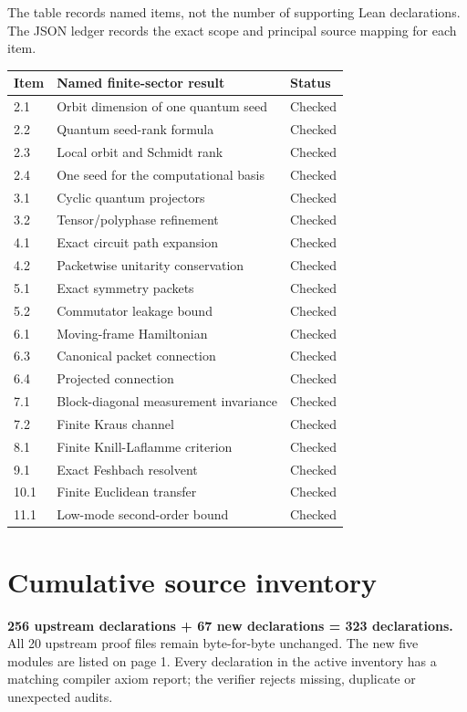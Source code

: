 \documentclass[10pt,letterpaper]{article}
\newcommand{\pageheading}[2]{\vspace*{2pt}{\small\color{ink}\textsc{#1}}\par\vspace{2pt}{\Large\bfseries #2}\par\vspace{4pt}}
\begin{document}
\newpage
\pageheading{Cumulative manuscript coverage}{All 19 finite-sector items}
The table records named items, not the number of supporting Lean declarations. The JSON ledger records the exact scope and principal source mapping for each item.
\begin{center}
\small\renewcommand{\arraystretch}{1.15}
\begin{tabularx}{\linewidth}{@{}lXl@{}}\toprule
Item & Named finite-sector result & Status\\\midrule
2.1 & Orbit dimension of one quantum seed & Checked\\
2.2 & Quantum seed-rank formula & Checked\\
2.3 & Local orbit and Schmidt rank & Checked\\
2.4 & One seed for the computational basis & Checked\\
3.1 & Cyclic quantum projectors & Checked\\
3.2 & Tensor/polyphase refinement & Checked\\
4.1 & Exact circuit path expansion & Checked\\
4.2 & Packetwise unitarity conservation & Checked\\
5.1 & Exact symmetry packets & Checked\\
5.2 & Commutator leakage bound & Checked\\
6.1 & Moving-frame Hamiltonian & Checked\\
6.3 & Canonical packet connection & Checked\\
6.4 & Projected connection & Checked\\
7.1 & Block-diagonal measurement invariance & Checked\\
7.2 & Finite Kraus channel & Checked\\
8.1 & Finite Knill-Laflamme criterion & Checked\\
9.1 & Exact Feshbach resolvent & Checked\\
10.1 & Finite Euclidean transfer & Checked\\
11.1 & Low-mode second-order bound & Checked\\
\bottomrule\end{tabularx}
\end{center}

\section*{Cumulative source inventory}
\textbf{256 upstream declarations + 67 new declarations = 323 declarations.}
All 20 upstream proof files remain byte-for-byte unchanged. The new five modules are listed on page 1. Every declaration in the active inventory has a matching compiler axiom report; the verifier rejects missing, duplicate or unexpected audits.
\end{document}
